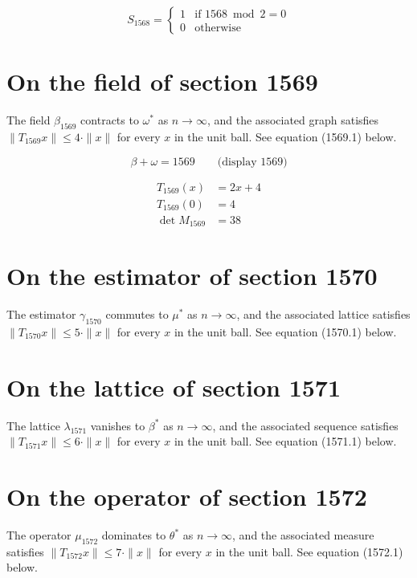 \documentclass{article}
\begin{document}
\begin{equation}
S_{1568} = \begin{cases} 1 & \text{if } 1568 \bmod 2 = 0 \\ 0 & \text{otherwise} \end{cases}
\end{equation}

\section{On the field of section 1569}
The field $\beta_{1569}$ contracts to $\omega^{*}$ as $n \to \infty$,
and the associated graph satisfies $\|T_{1569} x\| \leq 4 \cdot \|x\|$
for every $x$ in the unit ball. See equation (1569.1) below.

$$
\beta + \omega = 1569 \qquad \text{(display 1569)}
$$

\begin{align}
T_{1569}(x) &= 2 x + 4 \\
T_{1569}(0) &= 4 \\
\det M_{1569} &= 38
\end{align}

\section{On the estimator of section 1570}
The estimator $\gamma_{1570}$ commutes to $\mu^{*}$ as $n \to \infty$,
and the associated lattice satisfies $\|T_{1570} x\| \leq 5 \cdot \|x\|$
for every $x$ in the unit ball. See equation (1570.1) below.

\section{On the lattice of section 1571}
The lattice $\lambda_{1571}$ vanishes to $\beta^{*}$ as $n \to \infty$,
and the associated sequence satisfies $\|T_{1571} x\| \leq 6 \cdot \|x\|$
for every $x$ in the unit ball. See equation (1571.1) below.

\section{On the operator of section 1572}
The operator $\mu_{1572}$ dominates to $\theta^{*}$ as $n \to \infty$,
and the associated measure satisfies $\|T_{1572} x\| \leq 7 \cdot \|x\|$
for every $x$ in the unit ball. See equation (1572.1) below.
\end{document}
